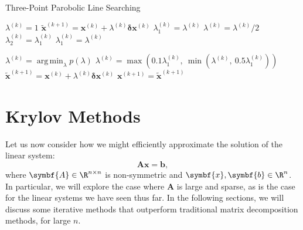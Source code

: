 \documentclass{article}
\DeclareMathOperator{\argmin}{arg\, min}
\begin{document}
\begin{algorithm}[H]
    \caption{Three-Point Parobolic Line Searching}
    \begin{algorithmic}
        \State \(\lambda^{\left( k \right)} = 1\)
        \State \(\tilde{\symbf{x}}^{\left( k + 1 \right)} = \symbf{x}^{\left( k \right)} + \lambda^{\left( k \right)} \symbf{\delta} \symbf{x}^{\left( k \right)}\) 
        \State \(\lambda_1^{\left( k \right)} = \lambda^{\left( k \right)}\)
        \State \(\lambda^{\left( k \right)} = \lambda^{\left( k \right)} / 2\)
        \Else
        \State \(\lambda_2^{\left( k \right)} = \lambda_1^{\left( k \right)}\)
        \State \(\lambda_1^{\left( k \right)} = \lambda^{\left( k \right)}\)

        \State \(\lambda^{\left( k \right)} = \argmin_{\lambda} p\left( \lambda \right)\)
        \State \(\lambda^{\left( k \right)} = \max{\left( 0.1 \lambda_1^{\left( k \right)},\: \min{\left( \lambda^{\left( k \right)},\: 0.5 \lambda_1^{\left( k \right)} \right)} \right)}\) 
        \EndIf
        \State \(\tilde{\symbf{x}}^{\left( k+1 \right)} = \symbf{x}^{\left( k \right)} + \lambda^{\left( k \right)} \symbf{\delta}{\symbf{x}}^{\left( k \right)}\)
        \EndWhile
        \State \(\symbf{x}^{\left( k+1 \right)} = \tilde{\symbf{x}}^{\left( k+1 \right)}\)
    \end{algorithmic}
\end{algorithm}
\part{Krylov Methods}
Let us now consider how we might efficiently approximate the solution
of the linear system:
\begin{equation*}
    \symbf{A} \symbf{x} = \symbf{b},
\end{equation*}
where \(\symbf{A} \in \R^{n \times n}\) is non-symmetric and \(\symbf{x},\symbf{b} \in \R^n\).
In particular, we will explore the case where \(\symbf{A}\) is large and
sparse, as is the case for the linear systems we have seen thus far. In
the following sections, we will discuss some iterative methods that
outperform traditional matrix decomposition methods, for large \(n\).
\end{document}
